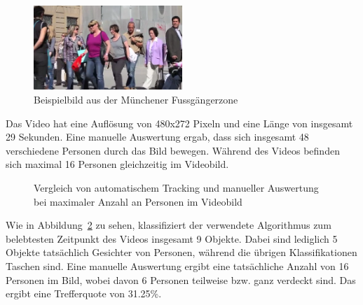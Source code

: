 \documentclass[a4paper, 11pt, twocolumn]{article}
\begin{document}
\begin{figure}[tb]
	\begin{center}
		\includegraphics[width=0.5\textwidth]{fussgaenger1.png}
	\end{center}
	\caption{Beispielbild aus der Münchener Fussgängerzone}
	\label{fig:fussgaenger_muenchen}
\end{figure}
	
Das Video hat eine Auflösung von 480x272 Pixeln und eine Länge von insgesamt 29 Sekunden. Eine manuelle Auswertung ergab, dass sich insgesamt 48 verschiedene Personen durch das Bild bewegen. Während des Videos befinden sich maximal 16 Personen gleichzeitig im Videobild. 

\begin{figure}[htpb]
	\hfill
	\caption{Vergleich von automatischem Tracking und manueller Auswertung bei maximaler Anzahl an Personen im Videobild}
	\label{fig:maxanzahl_fussgaenger}
\end{figure}

Wie in Abbildung~\ref{fig:maxanzahl_fussgaenger} zu sehen, klassifiziert der verwendete Algorithmus zum belebtesten Zeitpunkt des Videos insgesamt 9 Objekte. Dabei sind lediglich 5 Objekte tatsächlich Gesichter von Personen, während die übrigen Klassifikationen Taschen sind. Eine manuelle Auswertung ergibt eine tatsächliche Anzahl von 16 Personen im Bild, wobei davon 6 Personen teilweise bzw. ganz verdeckt sind. Das ergibt eine Trefferquote von 31.25\%.
\end{document}
